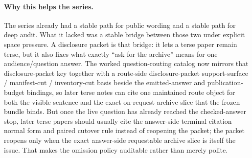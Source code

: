 \documentclass[11pt]{article}
\begin{document}
\paragraph{Why this helps the series.}
The series already had a stable path for public wording and a stable path for deep audit.
What it lacked was a stable bridge between those two under explicit space pressure.
A disclosure packet is that bridge: it lets a terse paper remain terse, but it also fixes what exactly ``ask for the archive'' means for one audience/question answer. The worked question-routing catalog now mirrors that disclosure-packet key together with a route-side disclosure-packet support-surface / manifest-cut / inventory-cut basis beside the emitted-answer and publication-budget bindings, so later terse notes can cite one maintained route object for both the visible sentence and the exact on-request archive slice that the frozen bundle binds.
But once the live question has already reached the checked-answer stop, later terse papers should usually cite the answer-side terminal citation normal form and paired cutover rule instead of reopening the packet; the packet reopens only when the exact answer-side requestable archive slice is itself the issue.\cite{series:challengeanswerreviewmenus,series:pairedterminalcitationdiscipline,series:pairedterminalcutoverrules}
That makes the omission policy auditable rather than merely polite.
\end{document}
